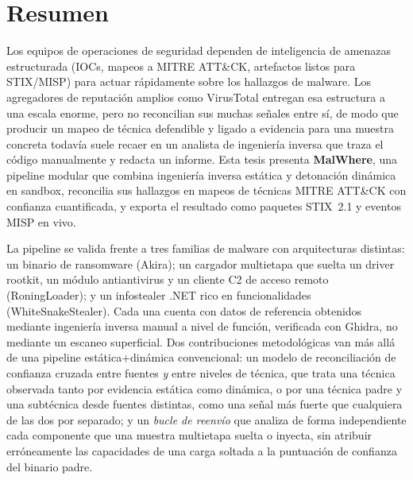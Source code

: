 \section*{Resumen}

Los equipos de operaciones de seguridad dependen de inteligencia de
amenazas estructurada (IOCs, mapeos a MITRE ATT\&CK, artefactos listos
para STIX/MISP) para actuar r\'apidamente sobre los hallazgos de
malware. Los agregadores de reputaci\'on amplios como VirusTotal
entregan esa estructura a una escala enorme, pero no reconcilian sus
muchas se\~nales entre s\'i, de modo que producir un mapeo de
t\'ecnica defendible y ligado a evidencia para una muestra concreta
todav\'ia suele recaer en un analista de ingenier\'ia inversa que
traza el c\'odigo manualmente y redacta un informe. Esta tesis
presenta \textbf{MalWhere}, una pipeline modular que combina
ingenier\'ia inversa est\'atica y detonaci\'on din\'amica en sandbox,
reconcilia sus hallazgos en mapeos de t\'ecnicas MITRE ATT\&CK con
confianza cuantificada, y exporta el resultado como paquetes STIX~2.1
y eventos MISP en vivo.

La pipeline se valida frente a tres familias de malware con
arquitecturas distintas: un binario de ransomware (Akira); un
cargador multietapa que suelta un driver rootkit, un m\'odulo
antiantivirus y un cliente C2 de acceso remoto (RoningLoader); y un
infostealer .NET rico en funcionalidades (WhiteSnakeStealer). Cada una
cuenta con datos de referencia obtenidos mediante ingenier\'ia inversa
manual a nivel de funci\'on, verificada con Ghidra, no mediante un
escaneo superficial. Dos contribuciones metodol\'ogicas van m\'as all\'a
de una pipeline est\'atica+din\'amica convencional: un modelo de
reconciliaci\'on de confianza cruzada entre fuentes \emph{y} entre
niveles de t\'ecnica, que trata una t\'ecnica observada tanto por
evidencia est\'atica como din\'amica, o por una t\'ecnica padre y una
subt\'ecnica desde fuentes distintas, como una se\~nal m\'as fuerte que
cualquiera de las dos por separado; y un \emph{bucle de
reenv\'io} que analiza de forma independiente cada componente que una
muestra multietapa suelta o inyecta, sin atribuir err\'oneamente las
capacidades de una carga soltada a la puntuaci\'on de confianza del
binario padre.


